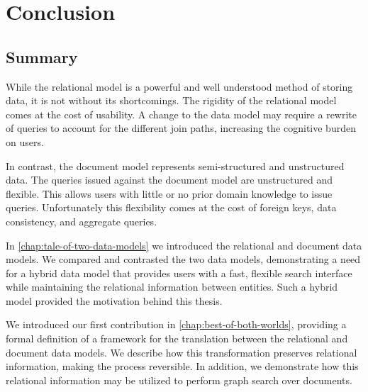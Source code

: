 \chapter{Conclusion}
\label{chap:conclusion}

% 	 	
% 	 	

	\section{Summary}
		While the relational model is a powerful and well understood method of storing data, it is not without its shortcomings.  The rigidity of the relational model comes at the cost of usability.  A change to the data model may require a rewrite of queries to account for the different join paths, increasing the cognitive burden on users.
		
		In contrast, the document model represents semi-structured and unstructured data.  The queries issued against the document model are unstructured and flexible.  This allows users with little or no prior domain knowledge to issue queries.  Unfortunately this flexibility comes at the cost of foreign keys, data consistency, and aggregate queries.
		
		In \cref{chap:tale-of-two-data-models} we introduced the relational and document data models.  We compared and contrasted the two data models, demonstrating a need for a hybrid data model that provides users with a fast, flexible search interface while maintaining the relational information between entities.  Such a hybrid model provided the motivation behind this thesis.
		
		We introduced our first contribution in \cref{chap:best-of-both-worlds}, providing a formal definition of a framework for the translation between the relational and document data models.  We describe how this transformation preserves relational information, making the process reversible.  In addition, we demonstrate how this relational information may be utilized to perform graph search over documents.
		
